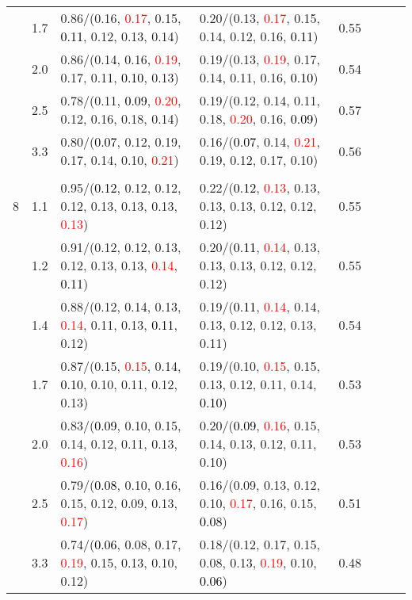 \documentclass[10pt,a4paper]{report}
\begin{document}
\begin{table}[!htbp]
\begin{center}
{\begin{tabular}{ccllcccc}
			&1.7&0.86/(0.16, \textcolor{red}{0.17}, 0.15, \textcolor{black}{0.11}, 0.12, 0.13, 0.14)&0.20/(0.13, \textcolor{red}{0.17}, 0.15, 0.14, 0.12, 0.16, \textcolor{black}{0.11})&0.55\\
			&2.0&0.86/(0.14, 0.16, \textcolor{red}{0.19}, 0.17, 0.11, \textcolor{black}{0.10}, 0.13)&0.19/(0.13, \textcolor{red}{0.19}, 0.17, 0.14, 0.11, 0.16, \textcolor{black}{0.10})&0.54\\
			&2.5&0.78/(0.11, \textcolor{black}{0.09}, \textcolor{red}{0.20}, 0.12, 0.16, 0.18, 0.14)&0.19/(0.12, 0.14, 0.11, 0.18, \textcolor{red}{0.20}, 0.16, \textcolor{black}{0.09})&0.57\\
			&3.3&0.80/(\textcolor{black}{0.07}, 0.12, 0.19, 0.17, 0.14, 0.10, \textcolor{red}{0.21})&0.16/(\textcolor{black}{0.07}, 0.14, \textcolor{red}{0.21}, 0.19, 0.12, 0.17, 0.10)&0.56\\
			&&&&\\
			8			&1.1&0.95/(\textcolor{black}{0.12}, 0.12, 0.12, 0.12, 0.13, 0.13, 0.13, \textcolor{red}{0.13})&0.22/(\textcolor{black}{0.12}, \textcolor{red}{0.13}, 0.13, 0.13, 0.13, 0.12, 0.12, 0.12)&0.55\\
			&1.2&0.91/(0.12, 0.12, 0.13, 0.12, 0.13, 0.13, \textcolor{red}{0.14}, \textcolor{black}{0.11})&0.20/(\textcolor{black}{0.11}, \textcolor{red}{0.14}, 0.13, 0.13, 0.13, 0.12, 0.12, 0.12)&0.55\\
			&1.4&0.88/(0.12, 0.14, 0.13, \textcolor{red}{0.14}, 0.11, 0.13, \textcolor{black}{0.11}, 0.12)&0.19/(\textcolor{black}{0.11}, \textcolor{red}{0.14}, 0.14, 0.13, 0.12, 0.12, 0.13, 0.11)&0.54\\
			&1.7&0.87/(0.15, \textcolor{red}{0.15}, 0.14, \textcolor{black}{0.10}, 0.10, 0.11, 0.12, 0.13)&0.19/(0.10, \textcolor{red}{0.15}, 0.15, 0.13, 0.12, 0.11, 0.14, \textcolor{black}{0.10})&0.53\\
			&2.0&0.83/(\textcolor{black}{0.09}, 0.10, 0.15, 0.14, 0.12, 0.11, 0.13, \textcolor{red}{0.16})&0.20/(\textcolor{black}{0.09}, \textcolor{red}{0.16}, 0.15, 0.14, 0.13, 0.12, 0.11, 0.10)&0.53\\
			&2.5&0.79/(\textcolor{black}{0.08}, 0.10, 0.16, 0.15, 0.12, 0.09, 0.13, \textcolor{red}{0.17})&0.16/(0.09, 0.13, 0.12, 0.10, \textcolor{red}{0.17}, 0.16, 0.15, \textcolor{black}{0.08})&0.51\\
			&3.3&0.74/(\textcolor{black}{0.06}, 0.08, 0.17, \textcolor{red}{0.19}, 0.15, 0.13, 0.10, 0.12)&0.18/(0.12, 0.17, 0.15, 0.08, 0.13, \textcolor{red}{0.19}, 0.10, \textcolor{black}{0.06})&0.48\\
			\bottomrule
		\end{tabular}}
	\end{center}
\end{table}
\end{document}
